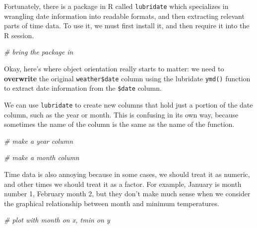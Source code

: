 \documentclass[
]{article}
\newenvironment{Shaded}{\begin{snugshade}}{\end{snugshade}}
\newcommand{\CommentTok}[1]{\textcolor[rgb]{0.56,0.35,0.01}{\textit{#1}}}
\begin{document}
Fortunately, there is a package in R called \texttt{lubridate} which
specializes in wrangling date information into readable formats, and
then extracting relevant parts of time data. To use it, we must first
install it, and then require it into the R session.

\begin{Shaded}
\begin{Highlighting}[]
\CommentTok{\# bring the package in}
\end{Highlighting}
\end{Shaded}

Okay, here's where object orientation really starts to matter: we need
to \textbf{overwrite} the original \texttt{weather\$date} column using
the lubridate \texttt{ymd()} function to extract date information from
the \texttt{\$date} column.

\begin{Shaded}
\end{Shaded}

We can use \texttt{lubridate} to create new columns that hold just a
portion of the date column, such as the year or month. This is confusing
in its own way, because sometimes the name of the column is the same as
the name of the function.

\begin{Shaded}
\begin{Highlighting}[]
\CommentTok{\# make a year column}

\CommentTok{\# make a month column}
\end{Highlighting}
\end{Shaded}

Time data is also annoying because in some cases, we should treat it as
numeric, and other times we should treat it as a factor. For example,
January is month number 1, February month 2, but they don't make much
sense when we consider the graphical relationship between month and
minimum temperatures.

\begin{Shaded}
\begin{Highlighting}[]
\CommentTok{\# plot with month on x, tmin on y}
\end{Highlighting}
\end{Shaded}
\end{document}
